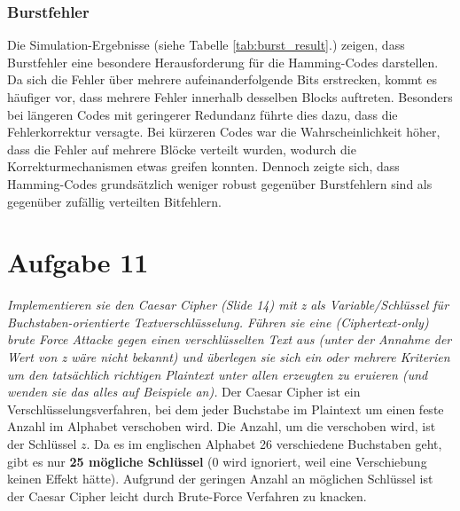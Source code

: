 \documentclass{article}
\begin{document}
    \subsubsection{Burstfehler}  
    Die Simulation-Ergebnisse (siehe Tabelle \ref{tab:burst_result}.) zeigen, dass Burstfehler eine besondere Herausforderung für die Hamming-Codes darstellen. 
    Da sich die Fehler über mehrere aufeinanderfolgende Bits erstrecken, kommt es häufiger vor, dass mehrere Fehler 
    innerhalb desselben Blocks auftreten. Besonders bei längeren Codes mit geringerer Redundanz führte dies dazu, 
    dass die Fehlerkorrektur versagte. Bei kürzeren Codes war die Wahrscheinlichkeit höher, dass die Fehler auf mehrere 
    Blöcke verteilt wurden, wodurch die Korrekturmechanismen etwas greifen konnten. Dennoch zeigte sich, 
    dass Hamming-Codes grundsätzlich weniger robust gegenüber Burstfehlern sind als gegenüber zufällig verteilten 
    Bitfehlern.
    
    \newpage
    \section{Aufgabe 11}
    \textit{Implementieren sie den Caesar Cipher (Slide 14) mit z als Variable/Schlüssel für
    Buchstaben-orientierte Textverschlüsselung. Führen sie eine (Ciphertext-only) brute
    Force Attacke gegen einen verschlüsselten Text aus (unter der Annahme der Wert
    von z wäre nicht bekannt) und überlegen sie sich ein oder mehrere Kriterien um den
    tatsächlich richtigen Plaintext unter allen erzeugten zu eruieren (und wenden sie das
    alles auf Beispiele an).}\vspace*{1em}\newline
    Der Caesar Cipher ist ein Verschlüsselungsverfahren, bei dem jeder Buchstabe im Plaintext um einen feste Anzahl
    im Alphabet verschoben wird. Die Anzahl, um die verschoben wird, ist der Schlüssel $z$. Da es im englischen Alphabet
    26 verschiedene Buchstaben geht, gibt es nur \textbf{25 mögliche Schlüssel} (0 wird ignoriert, weil eine Verschiebung 
    keinen Effekt hätte). Aufgrund der geringen Anzahl an möglichen Schlüssel ist der Caesar Cipher leicht durch Brute-Force 
    Verfahren zu knacken.
\end{document}
